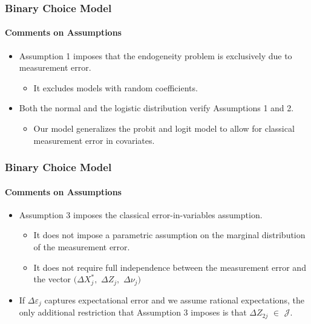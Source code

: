 \begin{frame}
\frametitle{Binary Choice Model}
\framesubtitle{Comments on Assumptions}

\begin{itemize}
	\item Assumption 1 imposes that the endogeneity problem is exclusively due to measurement error.
	\begin{itemize}
		\item It excludes models with random coefficients.
	\end{itemize}
	\item Both the normal and the logistic distribution verify Assumptions 1 and 2. 
	\begin{itemize}
		\item Our model generalizes the probit and logit model to allow for classical measurement error in covariates.
	\end{itemize}
\end{itemize}
\end{frame}

\begin{frame}
\frametitle{Binary Choice Model}
\framesubtitle{Comments on Assumptions}

\begin{itemize}
	\item Assumption 3 imposes the classical error-in-variables assumption.
	\begin{itemize}
		\item It does not impose a parametric assumption on the marginal distribution of the measurement error.
		\item It does not require full independence between the measurement error and the vector $(\Delta X^{*}_{j},$ $\Delta Z_{j},$ $\Delta\nu_{j})$
	\end{itemize}
	\item If $\Delta\varepsilon_{j}$ captures expectational error and we assume rational expectations, the only additional restriction that Assumption 3 imposes is that $\Delta Z_{2j}$ $\in$ $\mathcal{J}$.
\end{itemize}
\end{frame}

